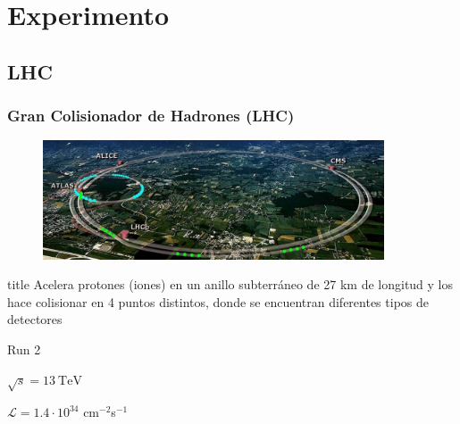 \documentclass[10pt, compress,spanish]{beamer}
\begin{document}
\begin{frame}[fragile]
\begin{columns}
\begin{column}{0.5\textwidth}
\end{column}
\end{columns}

\end{frame}





\section{Experimento}

\subsection{LHC}

\begin{frame}[fragile]
\frametitle{Gran Colisionador de Hadrones (LHC)}

\normalsize

\begin{figure}
\centering
\includegraphics[width=0.9\textwidth]{lhc-sim.jpg}
\end{figure}

\begin{beamercolorbox}[leftskip=\titlelf]{title}
\centering{}\normalsize Acelera protones (iones) en un anillo subterráneo de 27 km de longitud y los hace colisionar en 4 puntos distintos, donde se encuentran diferentes tipos de detectores
\end{beamercolorbox}


\vspace{1cm}
\centering

Run 2

$\sqrt{s}=13\:\text{TeV}$

$\mathcal{L} = 1.4\cdot 10^{34}$ cm$^{-2}$s$^{-1}$


\end{frame}



\end{document}
